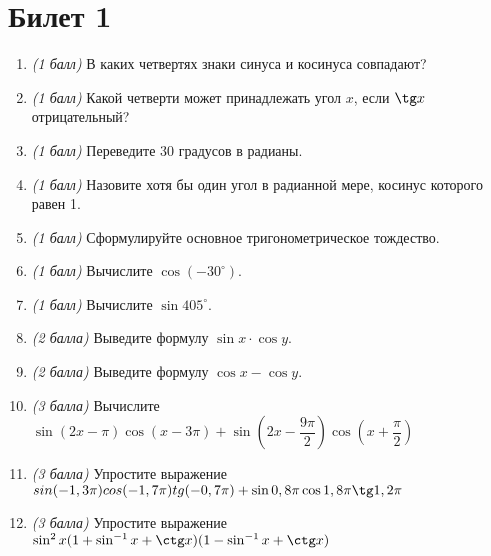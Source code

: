 \documentclass[12pt, a4paper]{article}
\begin{document}
	
	\section*{Билет 1}
	\begin{enumerate}
		\item \textit{(1 балл)} В каких четвертях знаки синуса и косинуса совпадают?
		\item \textit{(1 балл)} Какой четверти может принадлежать угол $x$, если $\tg x$ отрицательный?
		\item \textit{(1 балл)} Переведите 30 градусов в радианы.
		\item \textit{(1 балл)} Назовите хотя бы один угол в радианной мере, косинус которого равен 1.
		\item \textit{(1 балл)} Сформулируйте основное тригонометрическое тождество.
		\item \textit{(1 балл)} Вычислите $\cos (-30^{\circ})$.
		\item \textit{(1 балл)} Вычислите $\sin 405^{\circ}$.
		\item \textit{(2 балла)} Выведите формулу $\sin x \cdot \cos y$.
		\item \textit{(2 балла)} Выведите формулу $\cos x - \cos y$.
		\item \textit{(3 балла)} Вычислите $\sin (2x-\pi)  \cos (x-3\pi)  + \sin (2x-\dfrac{9\pi}{2}) \cos (x+\dfrac{\pi}{2})$
		\item \textit{(3 балла)} Упростите выражение $sin(-1,3\pi)cos(-1,7\pi)tg(-0,7\pi)+\sin 0,8\pi \cos 1,8\pi \tg 1,2\pi$
		\item \textit{(3 балла)} Упростите выражение $\sin^2 x(1+\sin^{-1}x + \ctg x)(1 - \sin^{-1}x + \ctg x)$
	\end{enumerate}
\end{document}
